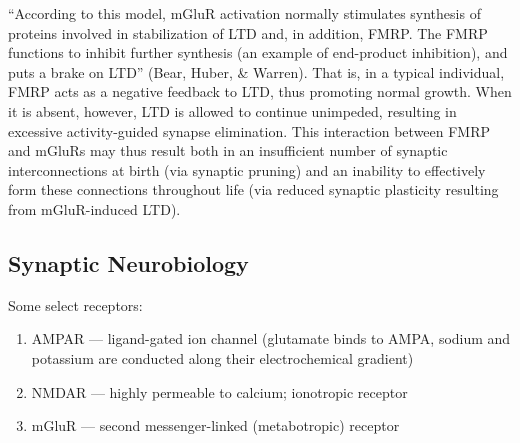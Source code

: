 ``According to this model, mGluR activation normally stimulates synthesis of proteins involved in stabilization of LTD and, in addition, FMRP. The FMRP functions to inhibit further synthesis (an example of end-product inhibition), and puts a brake on LTD'' (Bear, Huber, \& Warren). That is, in a typical individual, FMRP acts as a negative feedback to LTD, thus promoting normal growth. When it is absent, however, LTD is allowed to continue unimpeded, resulting in excessive activity-guided synapse elimination. This interaction between FMRP and mGluRs may thus result both in an insufficient number of synaptic interconnections at birth (via synaptic pruning) and an inability to effectively form these connections throughout life (via reduced synaptic plasticity resulting from mGluR-induced LTD).

\subsection{Synaptic Neurobiology}

Some select receptors:
\begin{enumerate}
	\item AMPAR --- ligand-gated ion channel (glutamate binds to AMPA, sodium and potassium are conducted along their electrochemical gradient)
	\item NMDAR --- highly permeable to calcium; ionotropic receptor
	\item mGluR --- second messenger-linked (metabotropic) receptor
\end{enumerate}